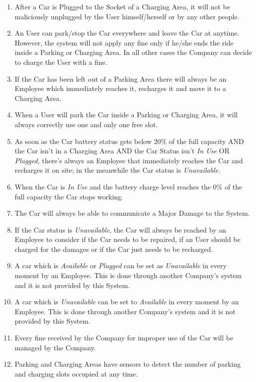 \begin{enumerate}
	\item After a Car is Plugged to the Socket of a Charging Area, it will not be maliciously unplugged by the User himself/herself or by any other people.
	\item An User can park/stop the Car everywhere and leave the Car at anytime. However, the system will not apply any fine only if he/she ends the ride inside a Parking or Charging Area. In all other cases the Company can decide to charge the User with a fine.
	\item If the Car has been left out of a Parking Area there will always be an Employee which immediately reaches it, recharges it and move it to a Charging Area. 
	\item When a User will park the Car inside a Parking or Charging Area, it will always correctly use one and only one free slot.		
	\item As soon as the Car battery status gets below 20\% of the full capacity AND the Car isn't in a Charging Area AND the Car Status isn't \textit{In Use} OR \textit{Plugged}, there's always an Employee that immediately reaches the Car and recharges it on site; in the meanwhile the Car status is \textit{Unavailable}.	
	\item When the Car is \textit{In Use} and the battery charge level reaches the 0\% of the full capacity the Car stops working.
	\item The Car will always be able to communicate a Major Damage to the System.
	\item If the Car status is \textit{Unavailable}, the Car will always be reached by an Employee to consider if the Car needs to be repaired, if an User should be charged for the damages or if the Car just needs to be recharged.
	\item A car which is \textit{Available} or \textit{Plugged} can be set as \textit{Unavailable} in every moment by an Employee. This is done through another Company's system and it is not provided by this System.
	\item A car which is \textit{Unavailable} can be set to \textit{Available} in every moment by an Employee. This is done through another Company's system and it is not provided by this System.
	\item Every fine received by the Company for improper use of the Car will be managed by the Company.
	\item Parking and Charging Areas have sensors to detect the number of parking and charging slots occupied at any time.
\end{enumerate}
\clearpage